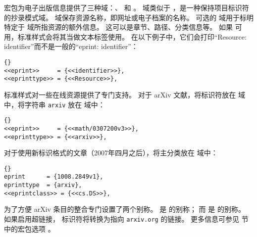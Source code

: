 \biblatex 宏包为电子出版信息提供了三种域：、 和 。
 域类似于 ，是一种保持项目标识符的抄录模式域。
 域保存资源名称，即网址或电子档案的名称。
可选的  域用于标明特定于  域所指资源的额外信息。
这可以是章节、路径、分类信息等。
如果  可用，标准样式会将其当做文本标签使用。
在以下例子中，它们会打印“Resource: identifier”而不是一般的“eprint: identifier”：

\begin{lstlisting}[style=bibtex]{}
<<eprint>>     = {<<identifier>>},
<<eprinttype>> = {<<Resource>>},
\end{lstlisting}
%
标准样式对一些在线资源提供了专门支持。
对于 arXiv 文献，将标识符放在  域中，将字符串 \texttt{arxiv} 放在  域中：

\begin{lstlisting}[style=bibtex]{}
<<eprint>>     = {<<math/0307200v3>>},
<<eprinttype>> = {<<arxiv>>},
\end{lstlisting}
%
对于使用新标识格式的文章（2007年四月之后），将主分类放在  域中：

\begin{lstlisting}[style=bibtex]{}
eprint      = {1008.2849v1},
eprinttype  = {arxiv},
<<eprintclass>> = {<<cs.DS>>},
\end{lstlisting}
%
为了方便 arXiv 条目的整合专门设置了两个别称。
 是  的别称；
而  是  的别称。
如果启用超链接， 标识符将转换为指向 \nolinkurl{arxiv.org} 的链接。
更多信息可参见  节中的宏包选项 。

